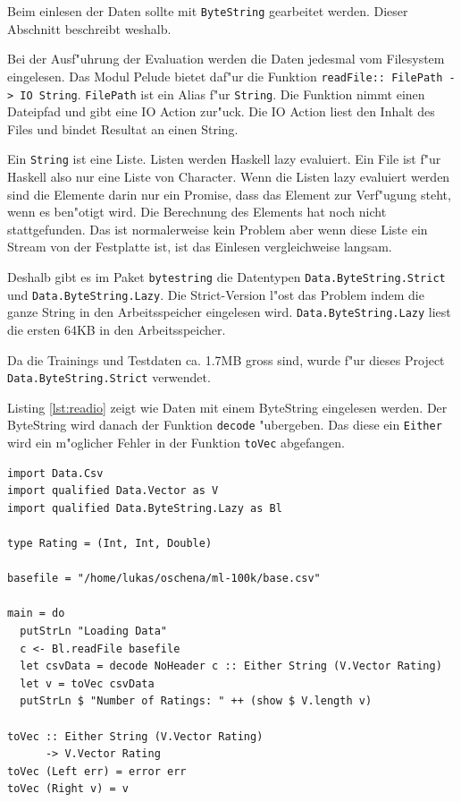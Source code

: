 \documentclass[a4paper, 12pt]{article}
\begin{document}
Beim einlesen der Daten sollte mit \verb|ByteString| gearbeitet werden. Dieser Abschnitt beschreibt weshalb.

Bei der Ausf"uhrung der Evaluation werden die Daten jedesmal vom Filesystem eingelesen. Das Modul Pelude bietet daf"ur die Funktion \verb|readFile:: FilePath -> IO String|. \verb|FilePath| ist ein Alias f"ur \verb|String|. Die Funktion nimmt einen Dateipfad und gibt eine IO Action zur"uck. Die IO Action liest den Inhalt des Files und bindet Resultat an einen String.

Ein \verb|String| ist eine Liste. Listen werden Haskell lazy evaluiert. Ein File ist f"ur Haskell also nur eine Liste von Character. Wenn die Listen lazy evaluiert werden sind die Elemente darin nur ein Promise, dass das Element zur Verf"ugung steht, wenn es ben"otigt wird. Die Berechnung des Elements hat noch nicht stattgefunden. Das ist normalerweise kein Problem aber wenn diese Liste ein Stream von der Festplatte ist, ist das Einlesen vergleichweise langsam.

Deshalb gibt es im Paket \verb|bytestring| die Datentypen \verb|Data.ByteString.Strict| und \verb|Data.ByteString.Lazy|. Die Strict-Version l"ost das Problem indem die ganze String in den Arbeitsspeicher eingelesen wird. \verb|Data.ByteString.Lazy| liest die ersten 64KB in den Arbeitsspeicher.

Da die Trainings und Testdaten ca. 1.7MB gross sind, wurde f"ur dieses Project \verb|Data.ByteString.Strict| verwendet.

Listing \ref{lst:readio} zeigt wie Daten mit einem ByteString eingelesen werden. Der ByteString wird danach der Funktion \verb|decode| "ubergeben. Das diese ein \verb|Either| wird ein m"oglicher Fehler in der Funktion \verb|toVec| abgefangen.

\begin{lstlisting}[label={lst:readio},caption={Einlesen von Files mit ByteString}]
import Data.Csv
import qualified Data.Vector as V
import qualified Data.ByteString.Lazy as Bl

type Rating = (Int, Int, Double)

basefile = "/home/lukas/oschena/ml-100k/base.csv"

main = do
  putStrLn "Loading Data"
  c <- Bl.readFile basefile
  let csvData = decode NoHeader c :: Either String (V.Vector Rating)
  let v = toVec csvData
  putStrLn $ "Number of Ratings: " ++ (show $ V.length v)

toVec :: Either String (V.Vector Rating)
      -> V.Vector Rating
toVec (Left err) = error err
toVec (Right v) = v
\end{lstlisting}
\end{document}
